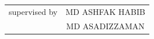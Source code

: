 \documentclass[a4paper,11pt]{report}
\begin{document}
\begin{titlepage}
	\vspace{1cm}
	\begin{tabular}{cc}
		supervised by & MD ASHFAK HABIB \\
		              & MD ASADIZZAMAN
	\end{tabular}

	\vfill
\end{titlepage}
\end{document}
